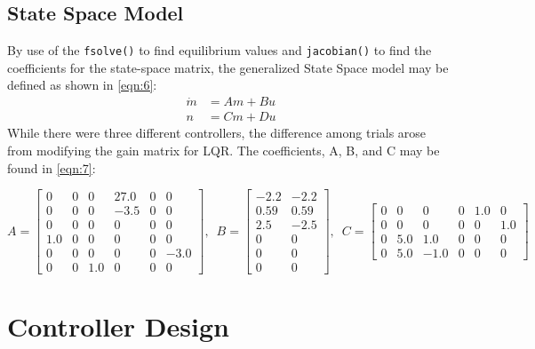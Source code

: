 \documentclass[12pt]{article}
\begin{document}
\subsection{State Space Model} \label{sec:2.3}
By use of the \lstinline{fsolve()} to find equilibrium values and \lstinline{jacobian()} to find the coefficients for the state-space matrix, the generalized State Space model may be defined as shown in \ref{eqn:6}:
\begin{equation} \label{eqn:6}
\begin{aligned}
    \dot{m} &= Am + Bu \\ n &= Cm + Du
\end{aligned}
\end{equation}
While there were three different controllers, the difference among trials arose from modifying the gain matrix for LQR.  The coefficients, A, B, and C may be found in \ref{eqn:7}:

\begin{equation} \label{eqn:7}
    A = \begin{bmatrix}
    0 & 0 & 0 & 27.0 & 0 & 0\\ 0 & 0 & 0 & -3.5 & 0 & 0\\ 0 & 0 & 0 & 0 & 0 & 0\\ 1.0 & 0 & 0 & 0 & 0 & 0\\ 0 & 0 & 0 & 0 & 0 & -3.0\\ 0 & 0 & 1.0 & 0 & 0 & 0
    \end{bmatrix}, \enspace
    B = \begin{bmatrix} -2.2 & -2.2\\ 0.59 & 0.59\\ 2.5 & -2.5\\ 0 & 0\\ 0 & 0\\ 0 & 0 \end{bmatrix}, \enspace
    C = \begin{bmatrix} 0 & 0 & 0 & 0 & 1.0 & 0\\ 0 & 0 & 0 & 0 & 0 & 1.0\\ 0 & 5.0 & 1.0 & 0 & 0 & 0\\ 0 & 5.0 & -1.0 & 0 & 0 & 0 \end{bmatrix}
\end{equation}

\section{Controller Design} \label{sec:3}
\end{document}
